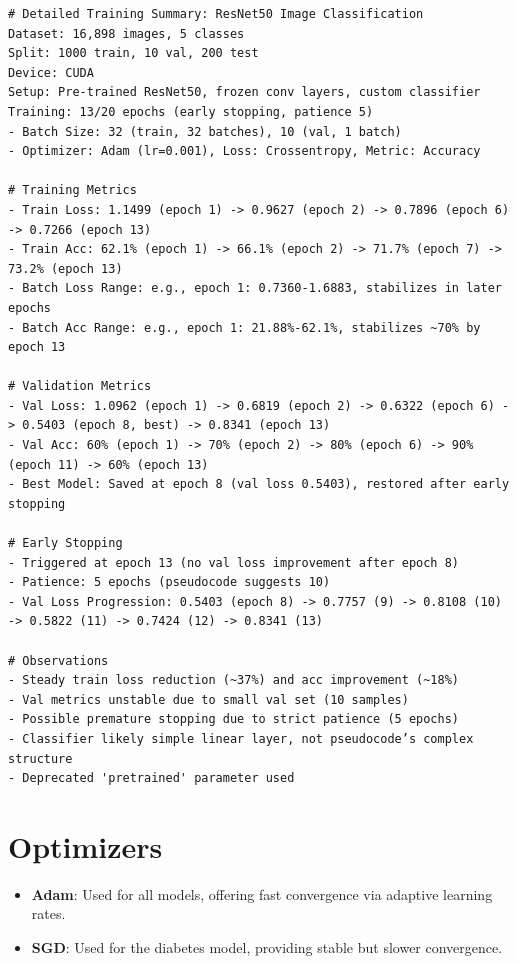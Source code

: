 \documentclass[a4paper,12pt]{article}
\begin{document}
\begin{verbatim}
# Detailed Training Summary: ResNet50 Image Classification
Dataset: 16,898 images, 5 classes
Split: 1000 train, 10 val, 200 test
Device: CUDA
Setup: Pre-trained ResNet50, frozen conv layers, custom classifier
Training: 13/20 epochs (early stopping, patience 5)
- Batch Size: 32 (train, 32 batches), 10 (val, 1 batch)
- Optimizer: Adam (lr=0.001), Loss: Crossentropy, Metric: Accuracy

# Training Metrics
- Train Loss: 1.1499 (epoch 1) -> 0.9627 (epoch 2) -> 0.7896 (epoch 6) -> 0.7266 (epoch 13)
- Train Acc: 62.1% (epoch 1) -> 66.1% (epoch 2) -> 71.7% (epoch 7) -> 73.2% (epoch 13)
- Batch Loss Range: e.g., epoch 1: 0.7360-1.6883, stabilizes in later epochs
- Batch Acc Range: e.g., epoch 1: 21.88%-62.1%, stabilizes ~70% by epoch 13

# Validation Metrics
- Val Loss: 1.0962 (epoch 1) -> 0.6819 (epoch 2) -> 0.6322 (epoch 6) -> 0.5403 (epoch 8, best) -> 0.8341 (epoch 13)
- Val Acc: 60% (epoch 1) -> 70% (epoch 2) -> 80% (epoch 6) -> 90% (epoch 11) -> 60% (epoch 13)
- Best Model: Saved at epoch 8 (val loss 0.5403), restored after early stopping

# Early Stopping
- Triggered at epoch 13 (no val loss improvement after epoch 8)
- Patience: 5 epochs (pseudocode suggests 10)
- Val Loss Progression: 0.5403 (epoch 8) -> 0.7757 (9) -> 0.8108 (10) -> 0.5822 (11) -> 0.7424 (12) -> 0.8341 (13)

# Observations
- Steady train loss reduction (~37%) and acc improvement (~18%)
- Val metrics unstable due to small val set (10 samples)
- Possible premature stopping due to strict patience (5 epochs)
- Classifier likely simple linear layer, not pseudocode’s complex structure
- Deprecated 'pretrained' parameter used
\end{verbatim}

\clearpage %

\section*{Optimizers}
\begin{itemize}
    \item \textbf{Adam}: Used for all models, offering fast convergence via adaptive learning rates.
    \item \textbf{SGD}: Used for the diabetes model, providing stable but slower convergence.
\end{itemize}
\end{document}
